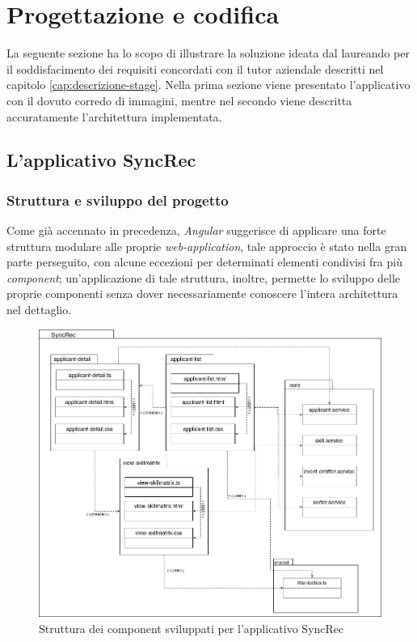 
\chapter{Progettazione e codifica}
\label{cap:progettazione-codifica}

La seguente sezione ha lo scopo di illustrare la soluzione ideata dal laureando per il soddisfacimento dei requisiti concordati con il tutor aziendale descritti nel capitolo \ref{cap:descrizione-stage}. Nella prima sezione viene presentato l'applicativo con il dovuto corredo di immagini, mentre nel secondo viene descritta accuratamente l'architettura implementata.


\section{L'applicativo SyncRec}
\subsection{Struttura e sviluppo del progetto}
Come già accennato in precedenza, \textit{Angular} suggerisce di applicare una forte struttura modulare alle proprie \textit{web-application}, tale approccio è stato nella gran parte perseguito, con alcune eccezioni per determinati elementi condivisi fra più \textit{component}; un'applicazione di tale struttura, inoltre, permette lo sviluppo delle proprie componenti senza dover necessariamente conoscere l'intera architettura nel dettaglio.

\begin{figure}[!h] 
	\centering 
	\includegraphics[width=1\columnwidth]{immagini/usecase/UML1} 
	\caption{Struttura dei component sviluppati per l'applicativo SyncRec}
	\label{figura:UML1}
\end{figure}


